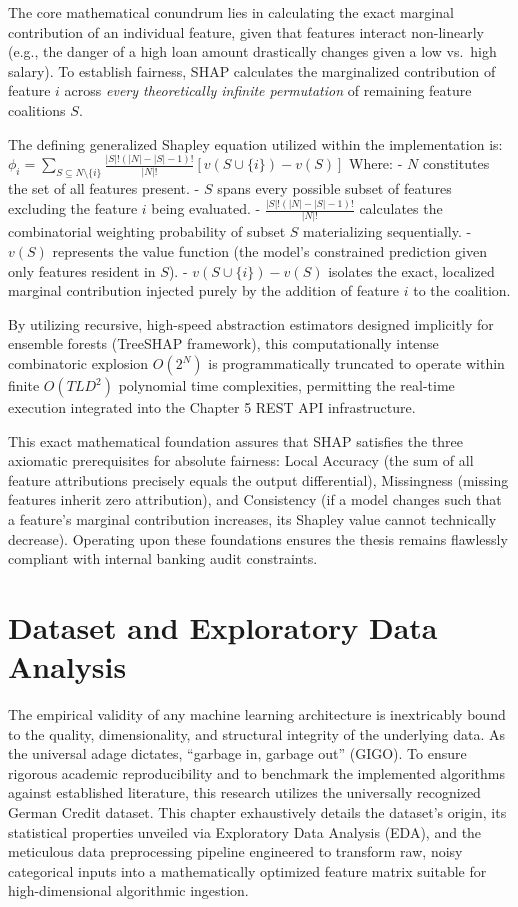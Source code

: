 The core mathematical conundrum lies in calculating the exact marginal
contribution of an individual feature, given that features interact
non-linearly (e.g., the danger of a high loan amount drastically changes
given a low vs.~high salary). To establish fairness, SHAP calculates the
marginalized contribution of feature \(i\) across \emph{every
theoretically infinite permutation} of remaining feature coalitions
\(S\).

The defining generalized Shapley equation utilized within the
implementation is:
\(\phi_i = \sum_{S \subseteq N \setminus \{i\}} \frac{|S|!(|N| - |S| - 1)!}{|N|!} \left[ v(S \cup \{i\}) - v(S) \right]\)
Where: - \(N\) constitutes the set of all features present. - \(S\)
spans every possible subset of features excluding the feature \(i\)
being evaluated. - \(\frac{|S|!(|N| - |S| - 1)!}{|N|!}\) calculates the
combinatorial weighting probability of subset \(S\) materializing
sequentially. - \(v(S)\) represents the value function (the model's
constrained prediction given only features resident in \(S\)). -
\(v(S \cup \{i\}) - v(S)\) isolates the exact, localized marginal
contribution injected purely by the addition of feature \(i\) to the
coalition.

By utilizing recursive, high-speed abstraction estimators designed
implicitly for ensemble forests (TreeSHAP framework), this
computationally intense combinatoric explosion \(O(2^N)\) is
programmatically truncated to operate within finite \(O(TLD^2)\)
polynomial time complexities, permitting the real-time execution
integrated into the Chapter 5 REST API infrastructure.

This exact mathematical foundation assures that SHAP satisfies the three
axiomatic prerequisites for absolute fairness: Local Accuracy (the sum
of all feature attributions precisely equals the output differential),
Missingness (missing features inherit zero attribution), and Consistency
(if a model changes such that a feature's marginal contribution
increases, its Shapley value cannot technically decrease). Operating
upon these foundations ensures the thesis remains flawlessly compliant
with internal banking audit constraints.

\hypertarget{dataset-and-exploratory-data-analysis}{%
\section{Dataset and Exploratory Data
Analysis}\label{dataset-and-exploratory-data-analysis}}

The empirical validity of any machine learning architecture is
inextricably bound to the quality, dimensionality, and structural
integrity of the underlying data. As the universal adage dictates,
``garbage in, garbage out'' (GIGO). To ensure rigorous academic
reproducibility and to benchmark the implemented algorithms against
established literature, this research utilizes the universally
recognized German Credit dataset. This chapter exhaustively details the
dataset's origin, its statistical properties unveiled via Exploratory
Data Analysis (EDA), and the meticulous data preprocessing pipeline
engineered to transform raw, noisy categorical inputs into a
mathematically optimized feature matrix suitable for high-dimensional
algorithmic ingestion.

